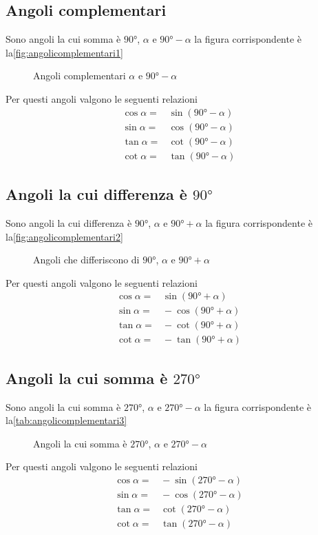 \subsection{Angoli complementari}
\label{sub:AngoliComp}
Sono angoli la cui somma è $\ang{90}$, $\alpha$ e $\ang{90}-\alpha$ la figura corrispondente è la\nobs\vref{fig:angolicomplementari1}
\begin{figure} %
	\centering
	
		\caption{Angoli complementari $\alpha$ e  $\ang{90}-\alpha$}
		\label{fig:angolicomplementari1}
\end{figure}
Per questi angoli valgono le seguenti relazioni
\begin{align*}
\cos\alpha=&{}\sin(\ang{90}-\alpha)\\
\sin\alpha=&{}\cos(\ang{90}-\alpha)\\
\tan\alpha=&{}\cot(\ang{90}-\alpha)\\
\cot\alpha=&{}\tan(\ang{90}-\alpha)
\end{align*}
\subsection{Angoli la cui differenza è $\ang{90}$}
Sono angoli la cui differenza è $\ang{90}$, $\alpha$ e $\ang{90}+\alpha$ la figura corrispondente è la\nobs\vref{fig:angolicomplementari2}
\begin{figure} %
	\centering
	
\caption{Angoli che differiscono di $\ang{90}$, $\alpha$ e $\ang{90}+\alpha$}
\label{fig:angolicomplementari2}
\end{figure}
Per questi angoli valgono le seguenti relazioni
\begin{align*}
\cos\alpha=&{}\sin(\ang{90}+\alpha)\\
\sin\alpha=&{}-\cos(\ang{90}+\alpha)\\
\tan\alpha=&{}-\cot(\ang{90}+\alpha)\\
\cot\alpha=&{}-\tan(\ang{90}+\alpha)
\end{align*}
\subsection{Angoli la cui somma è $\ang{270}$}
Sono angoli la cui somma è $\ang{270}$, $\alpha$ e $\ang{270}-\alpha$ la figura corrispondente è la\nobs\vref{tab:angolicomplementari3}
\begin{figure} %
	\centering
		
		\caption{Angoli la cui somma è $\ang{270}$,  $\alpha$ e $\ang{270}-\alpha$}
		\label{tab:angolicomplementari3}
\end{figure}
Per questi angoli valgono le seguenti relazioni
\begin{align*}
\cos\alpha=&{}-\sin(\ang{270}-\alpha)\\
\sin\alpha=&{}-\cos(\ang{270}-\alpha)\\
\tan\alpha=&{}\cot(\ang{270}-\alpha)\\
\cot\alpha=&{}\tan(\ang{270}-\alpha)
\end{align*}
